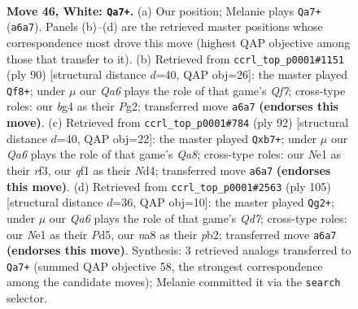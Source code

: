 \documentclass[11pt]{article}
\begin{document}
\clearpage

\begin{figure}[p]\centering
\begin{subfigure}{0.46\textwidth}\centering
\resizebox{\linewidth}{!}{%
\newchessgame
\chessboard[
  setfen={n6r/5k2/Q7/1p6/6bp/P2P4/7K/4Nq2 w - - 6 46},
  showmover=false,
  pgfstyle=straightmove, color=movearrow, markmove={a6-a7}
]}
\caption{}
\end{subfigure}\hfill
\begin{subfigure}{0.46\textwidth}\centering
\resizebox{\linewidth}{!}{%
\newchessgame
\chessboard[
  setfen={8/5Q2/2q1p2k/2NpP3/1rn5/2p5/2K2PP1/8 w - - 1 46},
  showmover=false,
  pgfstyle=straightmove, color=movearrow, markmove={f7-f8}
]}
\caption{}
\end{subfigure}
\\[4pt]
\begin{subfigure}{0.46\textwidth}\centering
\resizebox{\linewidth}{!}{%
\newchessgame
\chessboard[
  setfen={Q7/1p3kp1/7p/1P1p4/3N2q1/5r2/7K/8 w - - 2 47},
  showmover=false,
  pgfstyle=straightmove, color=movearrow, markmove={a8-b7}
]}
\caption{}
\end{subfigure}\hfill
\begin{subfigure}{0.46\textwidth}\centering
\resizebox{\linewidth}{!}{%
\newchessgame
\chessboard[
  setfen={5k2/p7/1p2QP2/3p4/6K1/8/PP1q4/8 b - - 0 53},
  showmover=false,
  pgfstyle=straightmove, color=movearrow, markmove={d2-g2}
]}
\caption{}
\end{subfigure}
\caption{\textbf{Move 46, White: \texttt{Qa7+}.} (a) Our position; Melanie plays \texttt{Qa7+} (\texttt{a6a7}). Panels (b)--(d) are the retrieved master positions whose correspondence most drove this move (highest QAP objective among those that transfer to it). (b) Retrieved from \texttt{ccrl\_top\_p0001\#1151} (ply 90) [structural distance $d$=40, QAP obj=26]: the master played \texttt{Qf8+}; under $\mu$ our \emph{Qa6} plays the role of that game's \emph{Qf7}; cross-type roles: our \emph{b}g4 as their \emph{P}g2; transferred move \texttt{a6a7} \textbf{(endorses this move)}. (c) Retrieved from \texttt{ccrl\_top\_p0001\#784} (ply 92) [structural distance $d$=40, QAP obj=22]: the master played \texttt{Qxb7+}; under $\mu$ our \emph{Qa6} plays the role of that game's \emph{Qa8}; cross-type roles: our \emph{N}e1 as their \emph{r}f3, our \emph{q}f1 as their \emph{N}d4; transferred move \texttt{a6a7} \textbf{(endorses this move)}. (d) Retrieved from \texttt{ccrl\_top\_p0001\#2563} (ply 105) [structural distance $d$=36, QAP obj=10]: the master played \texttt{Qg2+}; under $\mu$ our \emph{Qa6} plays the role of that game's \emph{Qd7}; cross-type roles: our \emph{N}e1 as their \emph{P}d5, our \emph{n}a8 as their \emph{p}b2; transferred move \texttt{a6a7} \textbf{(endorses this move)}. Synthesis: 3 retrieved analogs transferred to \texttt{Qa7+} (summed QAP objective 58, the strongest correspondence among the candidate moves); Melanie committed it via the \texttt{search} selector.}
\label{fig:thought-m90}
\end{figure}
\end{document}
